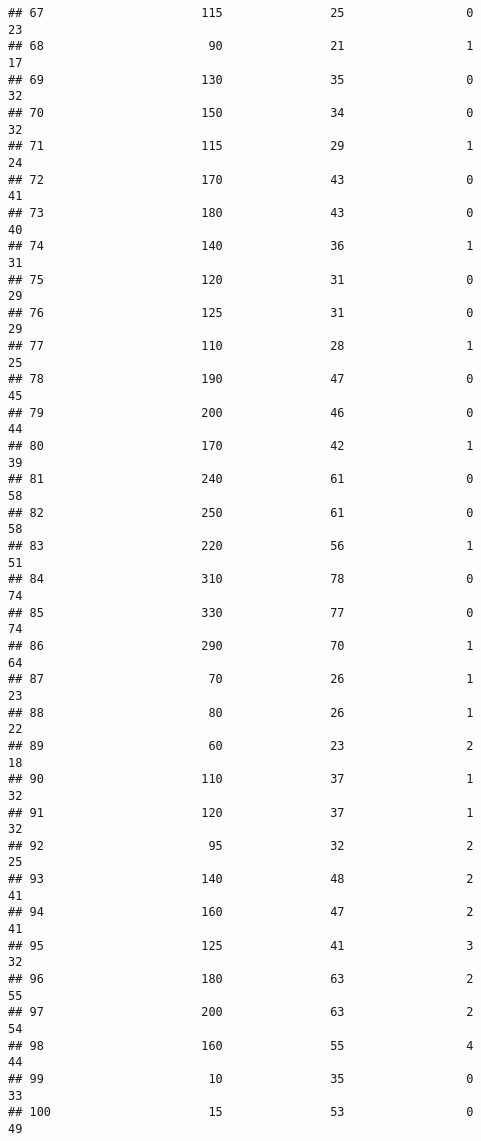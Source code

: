\documentclass[
]{article}
\begin{document}
\begin{verbatim}
## 67                      115               25                 0         23
## 68                       90               21                 1         17
## 69                      130               35                 0         32
## 70                      150               34                 0         32
## 71                      115               29                 1         24
## 72                      170               43                 0         41
## 73                      180               43                 0         40
## 74                      140               36                 1         31
## 75                      120               31                 0         29
## 76                      125               31                 0         29
## 77                      110               28                 1         25
## 78                      190               47                 0         45
## 79                      200               46                 0         44
## 80                      170               42                 1         39
## 81                      240               61                 0         58
## 82                      250               61                 0         58
## 83                      220               56                 1         51
## 84                      310               78                 0         74
## 85                      330               77                 0         74
## 86                      290               70                 1         64
## 87                       70               26                 1         23
## 88                       80               26                 1         22
## 89                       60               23                 2         18
## 90                      110               37                 1         32
## 91                      120               37                 1         32
## 92                       95               32                 2         25
## 93                      140               48                 2         41
## 94                      160               47                 2         41
## 95                      125               41                 3         32
## 96                      180               63                 2         55
## 97                      200               63                 2         54
## 98                      160               55                 4         44
## 99                       10               35                 0         33
## 100                      15               53                 0         49

\end{verbatim}
\end{document}
